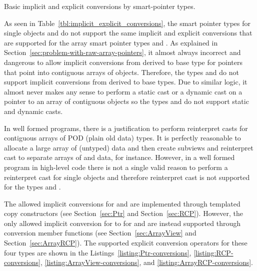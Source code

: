 \documentclass[pdf,ps2pdf,11pt]{SANDreport}
\begin{document}
\begin{table}
\begin{center}

\end{center}
\caption{\label{tbl:implicit_explicit_conversions}
Basic implicit and explicit conversions by smart-pointer types.}
\end{table}


As seen in Table~\ref{tbl:implicit_explicit_conversions}, the smart
pointer types for single objects {} and {} do not
support the same implicit and explicit conversions that are supported
for the array smart pointer types {} and
{}.  As explained in
Section~\ref{sec:problem-with-raw-array-pointers}, it almost always
incorrect and dangerous to allow implicit conversions from derived to
base type for pointers that point into contiguous arrays of objects.
Therefore, the types {} and {} do not
support implicit conversions from derived to base types.  Due to
similar logic, it almost never makes any sense to perform a static
cast or a dynamic cast on a pointer to an array of contiguous objects
so the types {} and {} do not support
static and dynamic casts.

In well formed programs, there is a justification to perform
reinterpret casts for contiguous arrays of POD (plain old data)
types. It is perfectly reasonable to allocate a large array of
{} (untyped) data and then create subviews and reinterpret
cast to separate arrays of {} and {} data, for
instance.  However, in a well formed program in high-level code there
is not a single valid reason to perform a reinterpret cast for single
objects and therefore reinterpret cast is not supported for the types
{} and {}.

The allowed implicit conversions for {} and {} are
implemented through templated copy constructors (see
Section~\ref{sec:Ptr} and Section~\ref{sec:RCP}).  However, the only
allowed implicit conversion for {} to {} for
{} and {} are instead supported through
conversion member functions (see Section~\ref{sec:ArrayView} and
Section~\ref{sec:ArrayRCP}).  The supported explicit conversion
operators for these four types are shown in the
Listings~\ref{listing:Ptr-conversions},
{}\ref{listing:RCP-conversions},
{}\ref{listing:ArrayView-conversions}, and
{}\ref{listing:ArrayRCP-conversions}.
\end{document}
